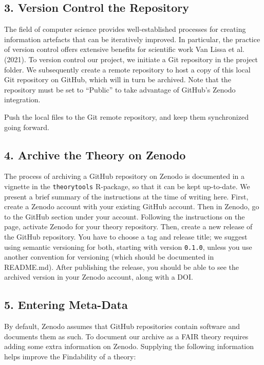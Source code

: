\documentclass[
  man,floatsintext]{apa6}
\begin{document}
\subsection{3. Version Control the Repository}\label{version-control-the-repository}

The field of computer science provides well-established processes for creating information artefacts that can be iteratively improved.
In particular, the practice of version control offers extensive benefits for scientific work Van Lissa et al. (2021).
To version control our project, we initiate a Git repository in the project folder.
We subsequently create a remote repository to host a copy of this local Git repository on GitHub, which will in turn be archived.
Note that the repository
must be set to ``Public'' to take advantage of GitHub's Zenodo integration.

Push the local files to the Git remote repository, and keep them synchronized going forward.

\subsection{4. Archive the Theory on Zenodo}\label{archive-the-theory-on-zenodo}

The process of archiving a GitHub repository on Zenodo is documented in a vignette in the \texttt{theorytools} R-package, so that it can be kept up-to-date.
We present a brief summary of the instructions at the time of writing here.
First, create a Zenodo account with your existing GitHub account.
Then in Zenodo, go to the GitHub section under your account.
Following the instructions on the page, activate Zenodo for your theory repository.
Then, create a new release of the GitHub repository.
You have to choose a tag and release title;
we suggest using semantic versioning for both, starting with version \texttt{0.1.0}, unless you use another convention for versioning (which should be documented in README.md).
After publishing the release,
you should be able to see the archived version in your Zenodo account,
along with a DOI.

\subsection{5. Entering Meta-Data}\label{entering-meta-data}

By default, Zenodo assumes that GitHub repositories contain software and documents them as such.
To document our archive as a FAIR theory requires adding some extra information on Zenodo.
Supplying the following information helps improve the Findability of a theory:
\end{document}
